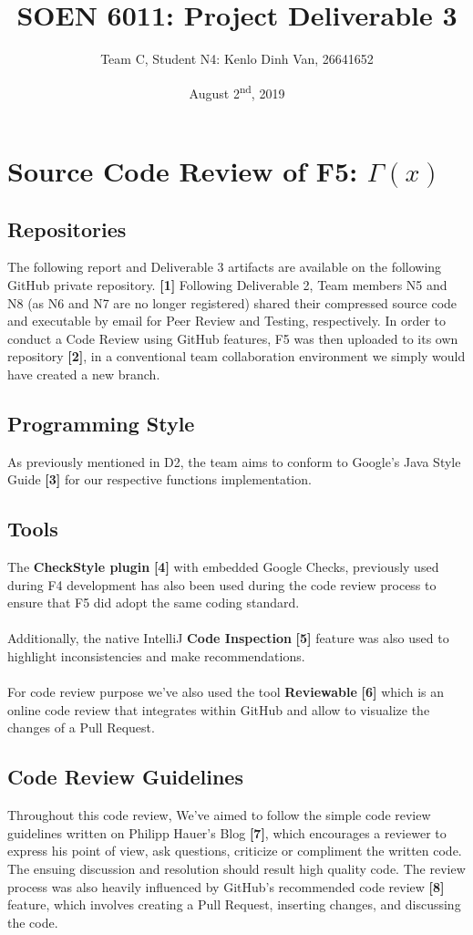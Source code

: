 \documentclass[12pt]{extarticle}
\title{SOEN 6011: Project Deliverable 3}
\author{Team C, Student N4: Kenlo Dinh Van, 26641652}
\date{August 2\textsuperscript{nd}, 2019}
\newcommand{\<}{\langle}
\renewcommand{\>}{\rangle}
\theoremstyle{definition}
\begin{document}
\maketitle

\section{Source Code Review of F5: \(\Gamma(x)\)}
\subsection{Repositories}
The following report and Deliverable 3 artifacts are available on the following GitHub private repository. \textbf{[1]}
Following Deliverable 2, Team members N5 and N8 (as N6 and N7 are no longer registered) shared their compressed source code and executable by email for Peer Review and Testing, respectively. In order to conduct a Code Review using GitHub features, F5 was then uploaded to its own repository \textbf{[2]}, in a conventional team collaboration environment we simply would have created a new branch.

\subsection{Programming Style}
As previously mentioned in D2, the team aims to conform to Google's Java Style Guide \textbf{[3]} for our respective functions implementation.

\subsection{Tools}
The \textbf {CheckStyle plugin }\textbf{[4]} with embedded Google Checks, previously used during F4 development has also been used during the code review process to ensure that F5 did adopt the same coding standard. \\ \\
Additionally, the native IntelliJ \textbf{Code Inspection} \textbf{[5]} feature was also used to highlight inconsistencies and make recommendations. \\ \\
For code review purpose we've also used the tool \textbf{Reviewable} \textbf{[6]}  which is an online code review that integrates within GitHub and allow to visualize the changes of a Pull Request.

\subsection{Code Review Guidelines}
Throughout this code review, We've aimed to follow the simple code review guidelines written on Philipp Hauer's Blog \textbf{[7]}, which encourages a reviewer to express his point of view, ask questions, criticize or compliment the written code. The ensuing discussion and resolution should result high quality code. The review process was also heavily influenced by GitHub's recommended code review \textbf{[8]} feature, which involves creating a Pull Request, inserting changes, and discussing the code.
\end{document}
